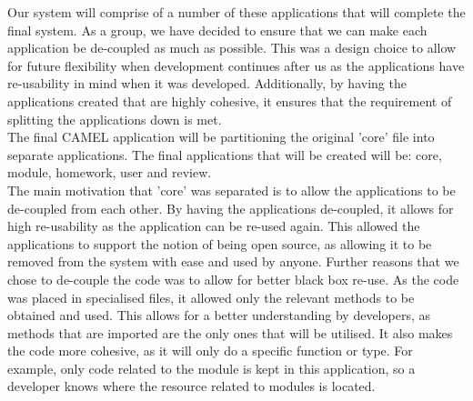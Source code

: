 		Our system will comprise of a number of these applications that will complete the final system. As a group, we have decided to ensure that we can make each application be de-coupled as much as possible. This was a design choice to allow for future flexibility when development continues after us as the applications have re-usability in mind when it was developed. Additionally, by having the applications created that are highly cohesive, it ensures that the requirement of splitting the applications down is met.\\
		
		The final CAMEL application will be partitioning the original 'core' file into separate applications. The final applications that will be created will be: core, module, homework, user and review.\\
		
		The main motivation that 'core' was separated is to allow the applications to be de-coupled from each other. By having the applications de-coupled, it allows for high re-usability as the application can be re-used again. This allowed the applications to support the notion of being open source, as allowing it to be removed from the system with ease and used by anyone. Further reasons that we chose to de-couple the code was to allow for better black box re-use. As the code was placed in specialised files, it allowed only the relevant methods to be obtained and used. This allows for a better understanding by developers, as methods that are imported are the only ones that will be utilised. It also makes the code more cohesive, as it will only do a specific function or type. For example, only code related to the module is kept in this application, so a developer knows where the resource related to modules is located.\\   